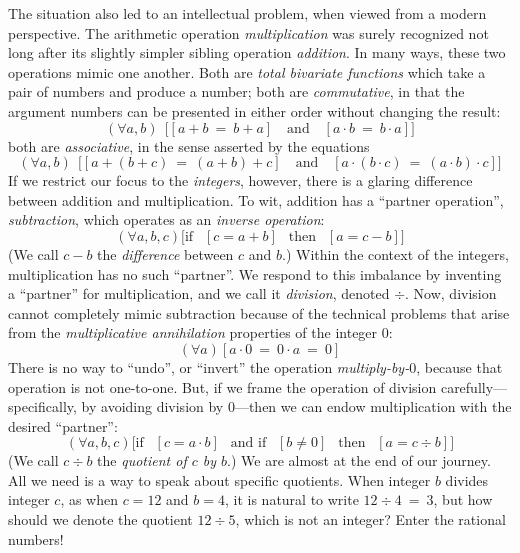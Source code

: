   
The situation also led to an intellectual problem, when viewed from a modern perspective.  The arithmetic operation {\it multiplication} was surely recognized not long after its slightly simpler sibling operation {\it addition}.  In many ways, these two operations mimic one another.  Both are {\em total bivariate functions} which take a pair of numbers and produce a number; both are {\em commutative}, in that the argument numbers can be presented in either order without changing the result:
\[ (\forall a,b) \ \ \big[ [a+b \ = \ b+a]
 \ \ \ \mbox{ and } \ \ \
[a \cdot b \ = \ b \cdot a] \big]
\]
both are {\em associative}, in the sense asserted by the equations
\[
(\forall a,b) \ \ \big[ [a+(b+c) \ = \ (a+b)+c]
 \ \ \ \mbox{ and } \ \ \ 
[a \cdot (b \cdot c) \ = \ (a \cdot b) \cdot c] \big]
\]
If we restrict our focus to the {\em integers}, however, there is a glaring difference between addition and multiplication.  To wit, addition has a ``partner operation'', {\it subtraction}, which operates as an {\it inverse operation}:
\[ (\forall a, b, c) \big[ \mbox{if } \ \ [c = a + b] \ \ \mbox{ then }  \ \ [a = c-b] \big]
\]
(We call $c-b$ the {\em difference} between $c$ and $b$.)  Within the context of the integers, multiplication has no such ``partner''.  We respond to this imbalance by inventing a ``partner'' for
multiplication, and we call it {\it division}, denoted $\div$.  Now, division cannot completely mimic subtraction because of the technical problems that arise from the {\em multiplicative annihilation} properties of the integer $0$:
\[ (\forall a) \left[ a \cdot 0 \ = \ 0 \cdot a \ = \ 0 \right] \] 
There is no way to ``undo'', or ``invert'' the operation {\em multiply-by-$0$}, because that operation is not one-to-one.  But, if we frame the operation of division carefully---specifically, by
avoiding division by $0$---then we can endow multiplication with the desired ``partner'':
\[ (\forall a, b, c) \big[ \mbox{if } \ \ [c = a \cdot b] \ \
\mbox{ and if } \ \ [b \neq 0] \ \
 \mbox{ then }  \ \ [a = c \div b] \big]
\]
(We call $c \div b$ the {\em quotient of $c$ by $b$}.)  We are almost at the end of our journey.  All we need is a way to speak about specific quotients.  When integer $b$ divides integer $c$, as when $c = 12$ and $b = 4$, it is natural to write $12 \div 4 \ = \ 3$, but how should we denote the quotient $12 \div 5$, which is not an integer?  Enter the rational numbers!
\index{quotient}

